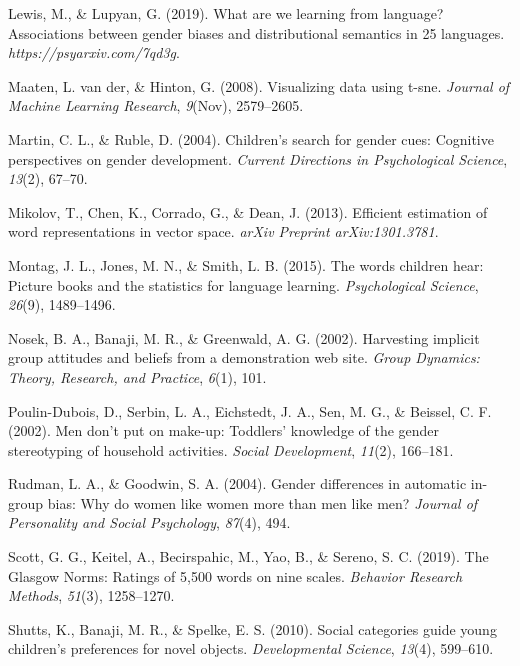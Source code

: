 \documentclass[english,,man,floatsintext]{apa6}
\begin{document}
\leavevmode\hypertarget{ref-lewis2019we}{}%
Lewis, M., \& Lupyan, G. (2019). What are we learning from language? Associations between gender biases and distributional semantics in 25 languages. \emph{https://psyarxiv.com/7qd3g}.

\leavevmode\hypertarget{ref-maaten2008visualizing}{}%
Maaten, L. van der, \& Hinton, G. (2008). Visualizing data using t-sne. \emph{Journal of Machine Learning Research}, \emph{9}(Nov), 2579--2605.

\leavevmode\hypertarget{ref-martin2004children}{}%
Martin, C. L., \& Ruble, D. (2004). Children's search for gender cues: Cognitive perspectives on gender development. \emph{Current Directions in Psychological Science}, \emph{13}(2), 67--70.

\leavevmode\hypertarget{ref-mikolov2013efficient}{}%
Mikolov, T., Chen, K., Corrado, G., \& Dean, J. (2013). Efficient estimation of word representations in vector space. \emph{arXiv Preprint arXiv:1301.3781}.

\leavevmode\hypertarget{ref-montag2015words}{}%
Montag, J. L., Jones, M. N., \& Smith, L. B. (2015). The words children hear: Picture books and the statistics for language learning. \emph{Psychological Science}, \emph{26}(9), 1489--1496.

\leavevmode\hypertarget{ref-nosek2002harvesting}{}%
Nosek, B. A., Banaji, M. R., \& Greenwald, A. G. (2002). Harvesting implicit group attitudes and beliefs from a demonstration web site. \emph{Group Dynamics: Theory, Research, and Practice}, \emph{6}(1), 101.

\leavevmode\hypertarget{ref-poulin2002men}{}%
Poulin-Dubois, D., Serbin, L. A., Eichstedt, J. A., Sen, M. G., \& Beissel, C. F. (2002). Men don't put on make-up: Toddlers' knowledge of the gender stereotyping of household activities. \emph{Social Development}, \emph{11}(2), 166--181.

\leavevmode\hypertarget{ref-rudman2004gender}{}%
Rudman, L. A., \& Goodwin, S. A. (2004). Gender differences in automatic in-group bias: Why do women like women more than men like men? \emph{Journal of Personality and Social Psychology}, \emph{87}(4), 494.

\leavevmode\hypertarget{ref-scott2019glasgow}{}%
Scott, G. G., Keitel, A., Becirspahic, M., Yao, B., \& Sereno, S. C. (2019). The Glasgow Norms: Ratings of 5,500 words on nine scales. \emph{Behavior Research Methods}, \emph{51}(3), 1258--1270.

\leavevmode\hypertarget{ref-shutts2010social}{}%
Shutts, K., Banaji, M. R., \& Spelke, E. S. (2010). Social categories guide young children's preferences for novel objects. \emph{Developmental Science}, \emph{13}(4), 599--610.
\end{document}
